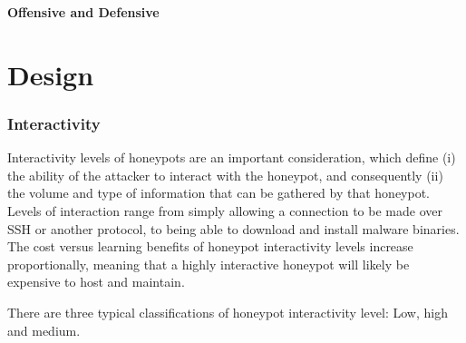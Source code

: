 \bullet \textbf{Offensive and Defensive}


\section{Design}


\subsubsection{Interactivity}

Interactivity levels of honeypots are an important consideration, which define (i) the ability of the attacker to interact with the honeypot, and consequently (ii) the volume and type of information that can be gathered by that honeypot. Levels of interaction range from simply allowing a connection to be made over SSH or another protocol, to being able to download and install malware binaries.  The cost versus learning benefits of honeypot interactivity levels increase proportionally, meaning that a highly interactive honeypot will likely be expensive to host and maintain. 

There are three typical classifications of honeypot interactivity level: Low, high and medium.

